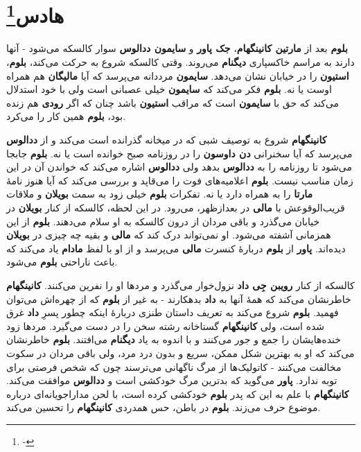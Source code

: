 \documentclass[12pt]{book}
\newcommand{\noun}[1]{{\textbf{#1}}}
\begin{document}
    \chapter[هادس]{هادس\protect\footnote{-}}\label{ep:6}
    \noun{بلوم} بعد از \noun{مارتین کانینگهام}، \noun{جک پاور} و \noun{سایمون ددالوس‬} سوار کالسکه می‌شود - آنها دارند به مراسم خاکسپاری \noun{دیگنام} می‌روند. وقتی کالسکه شروع به حرکت می‌کند، \noun{بلوم}، \noun{استیون} را در خیابان نشان می‌دهد. \noun{سایمون}  مرددانه می‌پرسد که آیا \noun{مالیگان} هم همراه اوست یا نه. \noun{بلوم} فکر می‌کند که \noun{سایمون}  خیلی عصبانی است ولی با خود استدلال می‌کند که حق با \noun{سایمون}  است که مراقب \noun{استیون} باشد چنان که اگر \noun{رودی} هم زنده بود، \noun{بلوم} همین کار را می‌کرد.

    \noun{کانینگهام} شروع به توصیف شبی که در میخانه گذرانده است می‌کند و از \noun{ددالوس} می‌پرسد که آیا سخنرانی \noun{دن داوسون} را در روزنامه صبح خوانده است یا نه. \noun{بلوم} جابجا می‌شود تا روزنامه را به \noun{ددالوس} بدهد ولی \noun{ددالوس} اشاره می‌کند که خواندن آن در این زمان مناسب نیست. \noun{بلوم} اعلامیه‌های فوت را می‌قاپد و بررسی می‌کند که آیا هنوز نامهٔ \noun{مارتا} را به همراه دارد یا نه. تفکرات \noun{بلوم} خیلی زود به سمت \noun{بویلان} و ملاقات قریب‌الوقوعش با \noun{مالی} در بعدازظهر، می‌رود. در این لحظه، کالسکه از کنار \noun{بویلان} در خیابان می‌گذرد و باقی مردان از درون کالسکه به او سلام می‌دهند. \noun{بلوم} از این همزمانی آشفته می‌شود. او نمی‌تواند درک کند که \noun{مالی} و بقیه چه چیزی در \noun{بویلان} دیده‌اند. \noun{پاور} از \noun{بلوم} دربارهٔ کنسرت \noun{مالی} می‌پرسد و از او با لفظ \noun{مادام} یاد می‌کند که باعث ناراحتی \noun{بلوم} می‌شود.

    کالسکه از کنار \noun{رویبن جِی داد} نزول‌خوار می‌گذرد و مردها او را نفرین می‌کنند. \noun{کانینگهام} خاطرنشان می‌کند که همهٔ آنها به \noun{داد} بدهکارند - به غیر از \noun{بلوم} که از چهره‌اش می‌توان فهمید. \noun{بلوم} شروع می‌کند به تعریف داستان طنزی دربارهٔ اینکه چطور پسرِ \noun{داد} غرق شده است، ولی \noun{کانینگهام} گستاخانه رشته سخن را در دست می‌گیرد. مردها زود خنده‌هایشان را جمع و جور می‌کنند و با اندوه به یاد \noun{دیگنام} می‌افتند. \noun{بلوم} خاطرنشان می‌کند که او به بهترین شکل ممکن، سریع و بدون درد مرد، ولی باقی مردان در سکوت مخالفت می‌کنند - کاتولیک‌ها از مرگ ناگهانی می‌ترسند چون که شخص فرصتی برای توبه ندارد. \noun{پاور} می‌گوید که بدترین مرگ خودکشی است و \noun{ددالوس} موافقت می‌کند. \noun{کانینگهام} با علم به این که پدر \noun{بلوم} خودکشی کرده است، با لحن مداراجویانه‌ای درباره موضوع حرف می‌زند. \noun{بلوم} در باطن، حس همدردی \noun{کانینگهام} را تحسین می‌کند.
\end{document}
